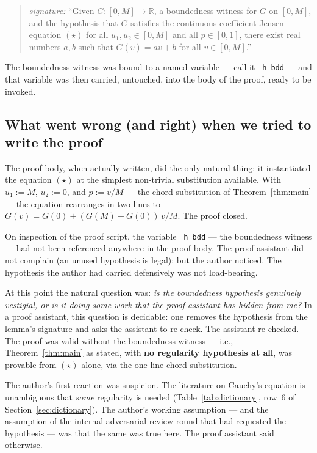 \documentclass[review,12pt,a4paper]{elsarticle}
\theoremstyle{remark}
\begin{document}
\begin{quote}
\emph{signature:} ``Given $G : [0, M] \to \mathbb{R}$, a boundedness
witness for $G$ on $[0, M]$, and the hypothesis that $G$ satisfies the
continuous-coefficient Jensen equation $(\star)$ for all
$u_1, u_2 \in [0, M]$ and all $p \in [0, 1]$, there exist real numbers
$a, b$ such that $G(v) = a v + b$ for all $v \in [0, M]$.''
\end{quote}

The boundedness witness was bound to a named variable --- call it
\texttt{\_h\_bdd} --- and that variable was then carried, untouched,
into the body of the proof, ready to be invoked.

\subsection{What went wrong (and right) when we tried to write the proof}

The proof body, when actually written, did the only natural thing: it
instantiated the equation $(\star)$ at the simplest non-trivial
substitution available. With $u_1 := M$, $u_2 := 0$, and $p := v / M$
--- the chord substitution of Theorem~\ref{thm:main} --- the equation
rearranges in two lines to $G(v) = G(0) + (G(M) - G(0))\, v / M$. The
proof closed.

On inspection of the proof script, the variable \texttt{\_h\_bdd} ---
the boundedness witness --- had not been referenced anywhere in the
proof body. The proof assistant did not complain (an unused hypothesis
is legal); but the author noticed. The hypothesis the author had carried
defensively was not load-bearing.

At this point the natural question was: \emph{is the boundedness
hypothesis genuinely vestigial, or is it doing some work that the proof
assistant has hidden from me?} In a proof assistant, this question is
decidable: one removes the hypothesis from the lemma's signature and
asks the assistant to re-check. The assistant re-checked. The proof was
valid without the boundedness witness --- i.e., Theorem~\ref{thm:main}
as stated, with \textbf{no regularity hypothesis at all}, was provable
from $(\star)$ alone, via the one-line chord substitution.

The author's first reaction was suspicion. The literature on Cauchy's
equation is unambiguous that \emph{some} regularity is needed
(Table~\ref{tab:dictionary}, row~6 of
Section~\ref{sec:dictionary}). The author's working assumption ---
and the assumption of the internal adversarial-review round that had
requested the hypothesis --- was that the same was true here. The proof
assistant said otherwise.
\end{document}
